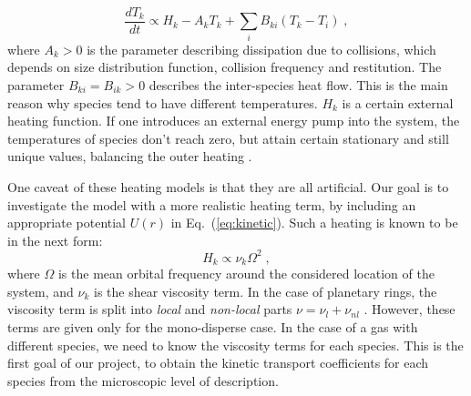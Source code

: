 \documentclass[11pt, notitlepage]{article} %
\begin{document}
\begin{equation}
	\frac{dT_k}{dt} \propto H_k -A_kT_k+\sum_{i}B_{ki}(T_k-T_i)\;,
\end{equation}
where $A_k>0$ is the parameter describing 
dissipation due to collisions, which depends on size distribution function, collision 
frequency and restitution. The parameter $B_{ki}=B_{ik}>0$ describes the inter-species 
heat flow. This is the main reason why species tend to have different temperatures. 
$H_k$ is a certain external heating function. If one introduces an external energy pump 
into the system, the temperatures of species don't reach zero, but attain certain 
stationary and still unique values, balancing the outer heating \citep{Bodrova2014}. 

One caveat of these heating models is that they are all artificial. Our goal 
is to investigate the model with a more realistic heating term, by including an appropriate potential $U(r)$ 
in Eq.~(\ref{eq:kinetic}). Such a heating is known to be in the next form:
\begin{equation}
	H_k \propto \nu_k\Omega^2\;,
\end{equation}
where $\Omega$ is the mean orbital frequency around the considered location of the system,
and $\nu_k$ is the shear viscosity term. In the case of planetary rings, the viscosity
term is split into \emph{local} and \emph{non-local} parts $\nu=\nu_l+\nu_{nl}$ 
\citep{Seiss2011,spahn2006c,Stewart1984}.
However, these terms are given only for the mono-disperse case. In the case of a gas 
with different species, we need to know the viscosity terms for each species. 
This is the first goal of our project, to obtain the kinetic transport coefficients
for each species from the microscopic level of description. 
\end{document}
